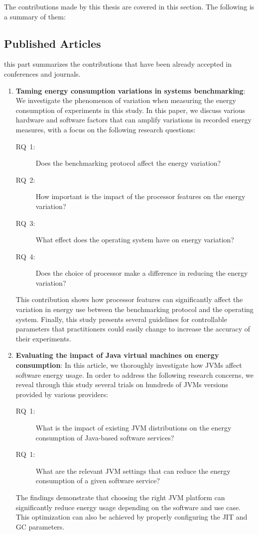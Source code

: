 The contributions made by this thesis are covered in this section. The following is a summary of them:

\subsection{Published Articles}
this part summarizes the contributions that have been already accepted in conferences and journals.

\begin{enumerate}
      \item \textbf{Taming energy consumption variations in systems benchmarking}: We investigate the phenomenon of variation when measuring the energy consumption of experiments in this study. In this paper, we discuss various hardware and software factors that can amplify variations in recorded energy measures, with a focus on the following research questions:
            \begin{description}
                  \item[\textsc{RQ}~1:] Does the benchmarking protocol affect the energy variation?
                  \item[\textsc{RQ}~2:] How important is the impact of the processor features on the energy variation?
                  \item[\textsc{RQ}~3:] What effect does the operating system have on energy variation?
                  \item[\textsc{RQ}~4:] Does the choice of processor make a difference in reducing the energy variation?
            \end{description}

            This contribution shows how processor features can significantly affect the variation in energy use between the benchmarking protocol and the operating system. Finally, this study presents several guidelines for controllable parameters that practitioners could easily change to increase the accuracy of their experiments.



      \item \textbf{Evaluating the impact of Java virtual machines on energy consumption}: In this article, we thoroughly investigate how JVMs affect software energy usage. In order to address the following research concerns, we reveal through this study several trials on hundreds of JVMs versions provided by various providers:
            \begin{description}
                  \item[\textsc{RQ}~1:] What is the impact of existing JVM distributions on the energy consumption of Java-based software services?
                  \item [\textsc{RQ}~1:] What are the relevant JVM settings that can reduce the energy consumption of a given software service?
            \end{description}
            The findings demonstrate that choosing the right JVM platform can significantly reduce energy usage depending on the software and use case. This optimization can also be achieved by properly configuring the JIT and GC parameters.


\end{enumerate}

